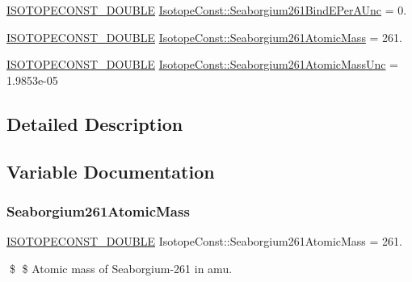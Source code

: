 \begin{DoxyCompactItemize}
\item 
\mbox{\hyperlink{group___isotope_const-_macros_ga8f45a7272ce02c0b4c65c44636ed719a}{I\+S\+O\+T\+O\+P\+E\+C\+O\+N\+S\+T\+\_\+\+D\+O\+U\+B\+LE}} \mbox{\hyperlink{group___isotope_const-_seaborgium-_sg261_gacaa54f7eddaf4496b84c468c81219df4}{Isotope\+Const\+::\+Seaborgium261\+Bind\+E\+Per\+A\+Unc}} = 0.
\item 
\mbox{\hyperlink{group___isotope_const-_macros_ga8f45a7272ce02c0b4c65c44636ed719a}{I\+S\+O\+T\+O\+P\+E\+C\+O\+N\+S\+T\+\_\+\+D\+O\+U\+B\+LE}} \mbox{\hyperlink{group___isotope_const-_seaborgium-_sg261_gac437980232e7df153a9d7aa89713caa7}{Isotope\+Const\+::\+Seaborgium261\+Atomic\+Mass}} = 261.
\item 
\mbox{\hyperlink{group___isotope_const-_macros_ga8f45a7272ce02c0b4c65c44636ed719a}{I\+S\+O\+T\+O\+P\+E\+C\+O\+N\+S\+T\+\_\+\+D\+O\+U\+B\+LE}} \mbox{\hyperlink{group___isotope_const-_seaborgium-_sg261_ga97a6839c66e6a413cba193b6b4b84b1b}{Isotope\+Const\+::\+Seaborgium261\+Atomic\+Mass\+Unc}} = 1.\+9853e-\/05
\end{DoxyCompactItemize}


\subsection{Detailed Description}


\subsection{Variable Documentation}
\mbox{\label{group___isotope_const-_seaborgium-_sg261_gac437980232e7df153a9d7aa89713caa7}} 
\subsubsection{\texorpdfstring{Seaborgium261\+Atomic\+Mass}{Seaborgium261AtomicMass}}
{\footnotesize\ttfamily \mbox{\hyperlink{group___isotope_const-_macros_ga8f45a7272ce02c0b4c65c44636ed719a}{I\+S\+O\+T\+O\+P\+E\+C\+O\+N\+S\+T\+\_\+\+D\+O\+U\+B\+LE}} Isotope\+Const\+::\+Seaborgium261\+Atomic\+Mass = 261.}

\$ \$ Atomic mass of Seaborgium-\/261 in amu. \mbox{\label{group___isotope_const-_seaborgium-_sg261_ga97a6839c66e6a413cba193b6b4b84b1b}} 
